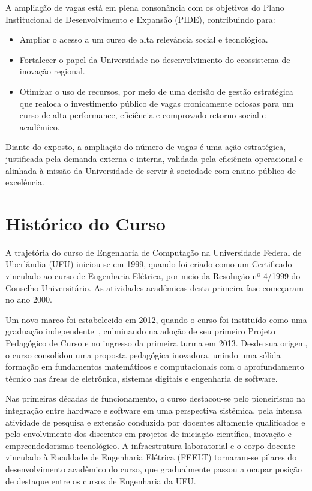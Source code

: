A ampliação de vagas está em plena consonância com os objetivos do Plano Institucional de Desenvolvimento e Expansão (PIDE), contribuindo para:

\begin{itemize}
    \item Ampliar o acesso a um curso de alta relevância social e tecnológica.
    \item Fortalecer o papel da Universidade no desenvolvimento do ecossistema de inovação regional.
    \item Otimizar o uso de recursos, por meio de uma decisão de gestão estratégica que realoca o investimento público de vagas cronicamente ociosas para um curso de alta performance, eficiência e comprovado retorno social e acadêmico.
\end{itemize}

Diante do exposto, a ampliação do número de vagas é uma ação estratégica, justificada pela demanda externa e interna, validada pela eficiência operacional e alinhada à missão da Universidade de servir à sociedade com ensino público de excelência.

\section{Histórico do Curso}

A trajetória do curso de Engenharia de Computação na Universidade Federal de Uberlândia (UFU) iniciou-se em 1999, quando foi criado como um Certificado vinculado ao curso de Engenharia Elétrica, por meio da Resolução nº 4/1999 do Conselho Universitário. As atividades acadêmicas desta primeira fase começaram no ano 2000.

Um novo marco foi estabelecido em 2012, quando o curso foi instituído como uma graduação independente~\cite{UFU:CONSUN:20:2012}, culminando na adoção de seu primeiro Projeto Pedagógico de Curso e no ingresso da primeira turma em 2013. Desde sua origem, o curso consolidou uma proposta pedagógica inovadora, unindo uma sólida formação em fundamentos matemáticos e computacionais com o aprofundamento técnico nas áreas de eletrônica, sistemas digitais e engenharia de software.

Nas primeiras décadas de funcionamento, o curso destacou-se pelo pioneirismo na integração entre hardware e software em uma perspectiva sistêmica, pela intensa atividade de pesquisa e extensão conduzida por docentes altamente qualificados e pelo envolvimento dos discentes em projetos de iniciação científica, inovação e empreendedorismo tecnológico. A infraestrutura laboratorial e o corpo docente vinculado à Faculdade de Engenharia Elétrica (FEELT) tornaram-se pilares do desenvolvimento acadêmico do curso, que gradualmente passou a ocupar posição de destaque entre os cursos de Engenharia da UFU.

